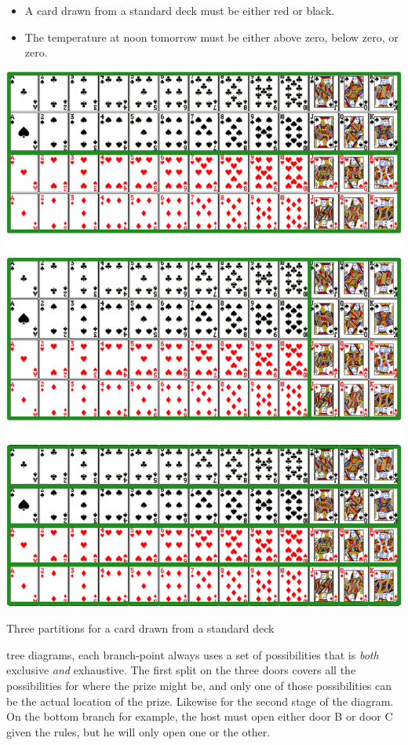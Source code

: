 \documentclass[justified]{tufte-book}
\providecommand{\tightlist}{%
  \setlength{\itemsep}{0pt}\setlength{\parskip}{0pt}}
\theoremstyle{definition}
\theoremstyle{definition}
\theoremstyle{definition}
\theoremstyle{definition}
\theoremstyle{remark}
\begin{document}
\begin{itemize}
\tightlist
\item
  A card drawn from a standard deck must be either red or black.
\item
  The temperature at noon tomorrow must be either above zero, below zero, or zero.
\end{itemize}

\begin{marginfigure}
\includegraphics{_main_files/figure-latex/unnamed-chunk-5-1} \caption[Three  partitions for a card drawn from a standard deck]{Three  partitions for a card drawn from a standard deck}\label{fig:unnamed-chunk-5}
\end{marginfigure}

 tree diagrams, each branch-point always uses a set of possibilities that is \emph{both} exclusive \emph{and} exhaustive. The first split on the three doors covers all the possibilities for where the prize might be, and only one of those possibilities can be the actual location of the prize. Likewise for the second stage of the diagram. On the bottom branch for example, the host must open either door B or door C given the rules, but he will only open one or the other.
\end{document}

